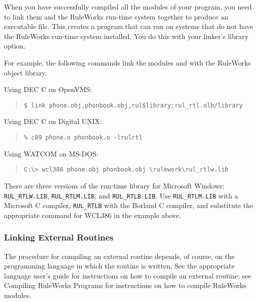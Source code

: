 When you have successfully compiled all the modules of your program,
you need to link them and the RuleWorks run-time system together to
produce an executable file.  This creates a program that can run on
systems that do not have the RuleWorks run-time system installed. You
do this with your linker's library option.

For example, the following commands link the modules  and
 with the RuleWorks object library.

Using DEC C on OpenVMS:

\begin{quote}
\begin{verbatim}
$ link phone.obj,phonbook.obj,rul$library:rul_rtl.olb/library
\end{verbatim}
\end{quote}  

Using DEC C on Digital UNIX:

\begin{quote}
\begin{verbatim}
% c89 phone.o phonbook.o -lrulrtl
\end{verbatim}
\end{quote}

Using WATCOM on MS-DOS:

\begin{quote}
\begin{verbatim}
C:\> wcl386 phone.obj phonbook.obj \rulework\rul_rtlw.lib
\end{verbatim}
\end{quote}  

There are three versions of the run-time library for Microsoft
Windows: \verb|RUL_RTLW.LIB|, \verb|RUL_RTLM.LIB|, and
\verb|RUL_RTLB.LIB|. Use \verb|RUL_RTLM.LIB| with a Microsoft C
compiler, \verb|RUL_RTLB| with the Borland C compiler, and substitute
the appropriate command for WCL386 in the example above.

\subsubsection{Linking External Routines}

The procedure for compiling an external routine depends, of course, on
the programming language in which the routine is written. See the
appropriate language user's guide for instructions on how to compile
an external routine; see Compiling RuleWorks Programs for instructions
on how to compile RuleWorks modules.

